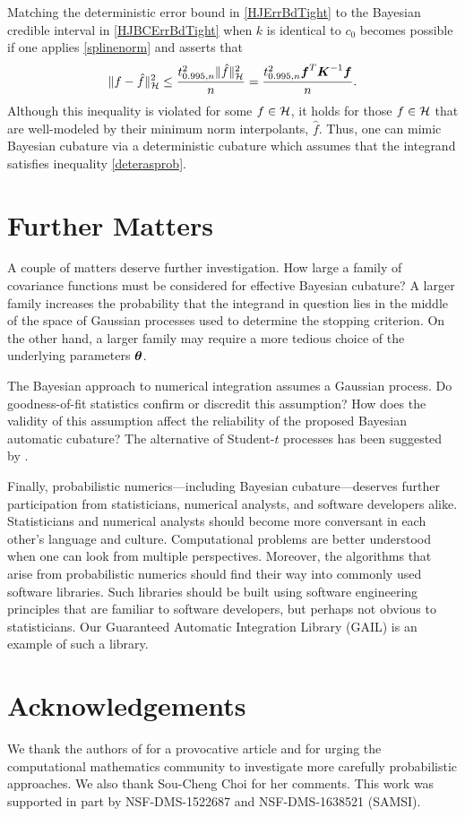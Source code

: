 \documentclass[sts]{imsart}
\numberwithin{equation}{section}
\theoremstyle{plain}
\newcommand{\calH}{\mathcal{H}}
\newcommand{\BOGOS}{\citetalias{BriEtal18a}}%
\begin{document}
Matching the deterministic error bound in \eqref{HJErrBdTight} to the Bayesian credible interval in  \eqref{HJBCErrBdTight} when  $k$ is identical to $c_0$ becomes possible if one applies \eqref{splinenorm} and asserts that 
\begin{equation}
\label{deterasprob}
\lVert f - \hat{f} \rVert_{\calH}^2 \le \frac{ t_{0.995,n}^2 \lVert \hat{f} \rVert^2_{\calH}}{n} = \frac{t_{0.995,n}^2 \vf^T \vK^{-1} \vf}{n}.
\end{equation}
Although this inequality is violated for some $f \in \mathcal{H}$, it holds for those $f \in \mathcal{H}$ that are well-modeled by their minimum norm interpolants, $\hat{f}$.  Thus, one can mimic Bayesian cubature via a deterministic cubature which assumes that the integrand satisfies inequality \eqref{deterasprob}.


\section{Further Matters}

A couple of matters deserve further investigation.  How large a family of covariance functions must be considered for effective Bayesian cubature?  A larger family increases the probability that the integrand in question lies in the middle of the space of Gaussian processes used to determine the stopping criterion.  On the other hand, a larger family may require a more tedious choice of the underlying parameters $\boldsymbol{\theta}$.

The Bayesian approach to numerical integration assumes a Gaussian process.  Do goodness-of-fit statistics confirm or discredit this assumption?  How does the validity of this assumption affect the reliability of the proposed Bayesian automatic cubature?  The alternative of Student-$t$ processes has been suggested by \cite{ShaWilGha14a}.

Finally, probabilistic numerics---including Bayesian cubature---deserves further participation from statisticians, numerical analysts, and software developers alike.  Statisticians and numerical analysts should become more conversant in each other's language and culture.  Computational problems are better understood when one can look from multiple perspectives.  Moreover, the algorithms that arise from probabilistic numerics should find their way into commonly used software libraries.  Such libraries should be built using  software engineering principles that are familiar to software developers, but perhaps not obvious to statisticians. Our Guaranteed Automatic Integration Library (GAIL) \cite{ChoEtal17b} is an example of such a library.




\section*{Acknowledgements}
We thank the authors of \BOGOS{} for a provocative article and for urging the computational mathematics community to investigate more carefully probabilistic approaches.  We also thank Sou-Cheng Choi for her comments. This work was supported in part by NSF-DMS-1522687 and NSF-DMS-1638521 (SAMSI).



\end{document}
